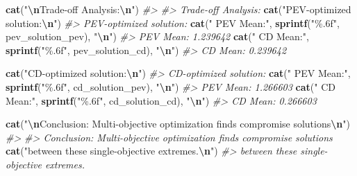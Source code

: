 \documentclass[
]{article}
\newenvironment{Shaded}{\begin{snugshade}}{\end{snugshade}}
\newcommand{\CommentTok}[1]{\textcolor[rgb]{0.56,0.35,0.01}{\textit{#1}}}
\newcommand{\FunctionTok}[1]{\textcolor[rgb]{0.13,0.29,0.53}{\textbf{#1}}}
\newcommand{\NormalTok}[1]{#1}
\newcommand{\SpecialCharTok}[1]{\textcolor[rgb]{0.81,0.36,0.00}{\textbf{#1}}}
\newcommand{\StringTok}[1]{\textcolor[rgb]{0.31,0.60,0.02}{#1}}
\begin{document}
\begin{Shaded}
\begin{Highlighting}[]
\FunctionTok{cat}\NormalTok{(}\StringTok{"}\SpecialCharTok{\textbackslash{}n}\StringTok{Trade{-}off Analysis:}\SpecialCharTok{\textbackslash{}n}\StringTok{"}\NormalTok{)}
\CommentTok{\#\textgreater{} }
\CommentTok{\#\textgreater{} Trade{-}off Analysis:}
\FunctionTok{cat}\NormalTok{(}\StringTok{"PEV{-}optimized solution:}\SpecialCharTok{\textbackslash{}n}\StringTok{"}\NormalTok{)}
\CommentTok{\#\textgreater{} PEV{-}optimized solution:}
\FunctionTok{cat}\NormalTok{(}\StringTok{"  PEV Mean:"}\NormalTok{, }\FunctionTok{sprintf}\NormalTok{(}\StringTok{"\%.6f"}\NormalTok{, pev\_solution\_pev), }\StringTok{"}\SpecialCharTok{\textbackslash{}n}\StringTok{"}\NormalTok{)}
\CommentTok{\#\textgreater{}   PEV Mean: 1.239642}
\FunctionTok{cat}\NormalTok{(}\StringTok{"  CD Mean:"}\NormalTok{, }\FunctionTok{sprintf}\NormalTok{(}\StringTok{"\%.6f"}\NormalTok{, pev\_solution\_cd), }\StringTok{"}\SpecialCharTok{\textbackslash{}n}\StringTok{"}\NormalTok{)}
\CommentTok{\#\textgreater{}   CD Mean: 0.239642}

\FunctionTok{cat}\NormalTok{(}\StringTok{"CD{-}optimized solution:}\SpecialCharTok{\textbackslash{}n}\StringTok{"}\NormalTok{)}
\CommentTok{\#\textgreater{} CD{-}optimized solution:}
\FunctionTok{cat}\NormalTok{(}\StringTok{"  PEV Mean:"}\NormalTok{, }\FunctionTok{sprintf}\NormalTok{(}\StringTok{"\%.6f"}\NormalTok{, cd\_solution\_pev), }\StringTok{"}\SpecialCharTok{\textbackslash{}n}\StringTok{"}\NormalTok{)}
\CommentTok{\#\textgreater{}   PEV Mean: 1.266603}
\FunctionTok{cat}\NormalTok{(}\StringTok{"  CD Mean:"}\NormalTok{, }\FunctionTok{sprintf}\NormalTok{(}\StringTok{"\%.6f"}\NormalTok{, cd\_solution\_cd), }\StringTok{"}\SpecialCharTok{\textbackslash{}n}\StringTok{"}\NormalTok{)}
\CommentTok{\#\textgreater{}   CD Mean: 0.266603}

\FunctionTok{cat}\NormalTok{(}\StringTok{"}\SpecialCharTok{\textbackslash{}n}\StringTok{Conclusion: Multi{-}objective optimization finds compromise solutions}\SpecialCharTok{\textbackslash{}n}\StringTok{"}\NormalTok{)}
\CommentTok{\#\textgreater{} }
\CommentTok{\#\textgreater{} Conclusion: Multi{-}objective optimization finds compromise solutions}
\FunctionTok{cat}\NormalTok{(}\StringTok{"between these single{-}objective extremes.}\SpecialCharTok{\textbackslash{}n}\StringTok{"}\NormalTok{)}
\CommentTok{\#\textgreater{} between these single{-}objective extremes.}
\end{Highlighting}
\end{Shaded}
\end{document}
